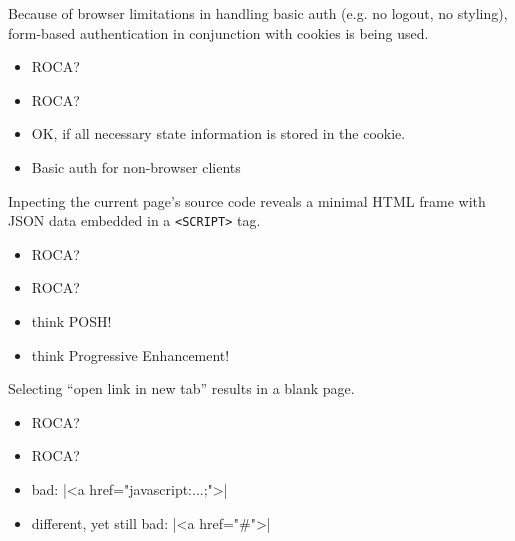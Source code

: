 \documentclass{beamer}
\newcommand{\rocaok}{\ding{51}}
\newcommand{\rocafail}{\ding{55}}
\begin{document}
\begin{frame}
  Because of browser limitations in handling basic auth (e.g. no logout, no styling),
  form-based authentication in conjunction with cookies is being used.

  \vspace{0.3cm}
  \begin{itemize}
    \item<1|only@1>[\Large $\square$] \Large ROCA?
    \item<2|only@2>[\Large \rocaok] \Large ROCA?
    \item<2> OK, if all necessary state information is stored in the cookie.
    \item<2> Basic auth for non-browser clients
  \end{itemize}

\end{frame}


\begin{frame}
  Inpecting the current page's source code reveals a minimal HTML frame with
  JSON data embedded in a \texttt{<SCRIPT>} tag.

  \vspace{0.3cm}
  \begin{itemize}
    \item<1|only@1>[\Large $\square$] \Large ROCA?
    \item<2|only@2>[\Large \rocafail] \Large ROCA?
    \item<2> think POSH!
    \item<2> think Progressive Enhancement!
  \end{itemize}

\end{frame}

\begin{frame}[fragile]
  Selecting ``open link in new tab'' results in a blank page.

  \vspace{0.3cm}
  \begin{itemize}
    \item<1|only@1>[\Large $\square$] \Large ROCA?
    \item<2|only@2>[\Large \rocafail] \Large ROCA?
    \item<2> bad: |<a href="javascript:...;">|
    \item<2> different, yet still bad: |<a href="#">|
  \end{itemize}
\end{frame}
\end{document}
